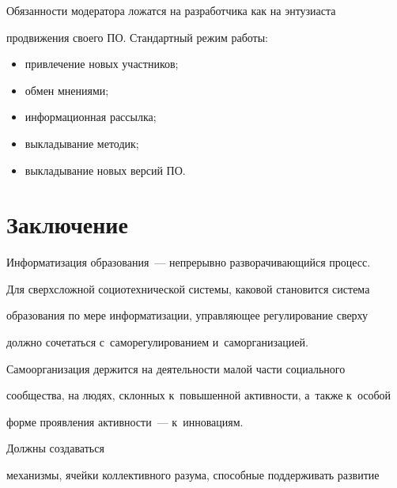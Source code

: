   Обязанности модератора ложатся на разработчика как на энтузиаста

продвижения своего ПО. Стандартный режим работы:

  \begin{itemize}

  \item привлечение новых участников;\\[-14pt]

  \item обмен мнениями;\\[-14pt]

  \item информационная рассылка;\\[-14pt]

  \item выкладывание методик;\\[-14pt]

  \item выкладывание новых версий ПО.

  \end{itemize}



  \vspace*{-6pt}



  \section{Заключение}



    \vspace*{-2pt}



  Информатизация образования~--- непрерывно разворачивающийся процесс.

Для сверхсложной социотехнической системы, каковой становится система

образования по мере информатизации, управляющее регулирование сверху

должно сочетаться с~саморегулированием и~саморганизацией.

Самоорганизация держится на деятельности малой части социального

сообщества, на людях, склонных к~повышенной активности, а~также к~особой

форме проявления активности~--- к~инновациям.

Должны создаваться

механизмы, ячейки коллективного разума, способные поддерживать развитие

